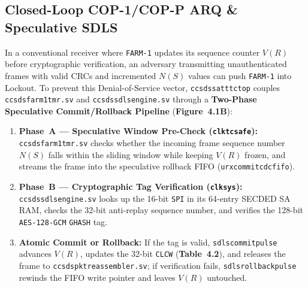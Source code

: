 \documentclass[10pt,a4paper]{article}
\renewcommand{\_}{\origunderscore\penalty0\hskip0pt\relax}
\numberwithin{table}{section}
\numberwithin{figure}{section}
\numberwithin{equation}{section}
\begin{document}
\subsection{Closed-Loop COP-1/COP-P ARQ \& Speculative SDLS}
In a conventional receiver where \texttt{FARM-1} updates its sequence counter $V(R)$ before cryptographic verification, an adversary transmitting unauthenticated frames with valid CRCs and incremented $N(S)$ values can push \texttt{FARM-1} into Lockout. To prevent this Denial-of-Service vector, \texttt{ccsds\_sat\_ttc\_top} couples \texttt{ccsds\_farm1\_tmr.sv} and \texttt{ccsds\_sdls\_engine.sv} through a \textbf{Two-Phase Speculative Commit/Rollback Pipeline} (\textbf{Figure~4.1B}):
\begin{enumerate}\setlength{\itemsep}{2pt}
    \item \textbf{Phase~A --- Speculative Window Pre-Check (\texttt{clk\_tc\_safe}):} \texttt{ccsds\_farm1\_tmr.sv} checks whether the incoming frame sequence number $N(S)$ falls within the sliding window while keeping $V(R)$ frozen, and streams the frame into the speculative rollback FIFO (\texttt{u\_rx\_commit\_cdc\_fifo}).
    \item \textbf{Phase~B --- Cryptographic Tag Verification (\texttt{clk\_sys}):} \texttt{ccsds\_sdls\_engine.sv} looks up the 16-bit \texttt{SPI} in its 64-entry SECDED SA RAM, checks the 32-bit anti-replay sequence number, and verifies the 128-bit \texttt{AES-128-GCM} \texttt{GHASH} tag.
    \item \textbf{Atomic Commit or Rollback:} If the tag is valid, \texttt{sdls\_commit\_pulse} advances $V(R)$, updates the 32-bit \texttt{CLCW} (\textbf{Table~4.2}), and releases the frame to \texttt{ccsds\_pkt\_reassembler.sv}; if verification fails, \texttt{sdls\_rollback\_pulse} rewinds the FIFO write pointer and leaves $V(R)$ untouched.
\end{enumerate}
\end{document}
